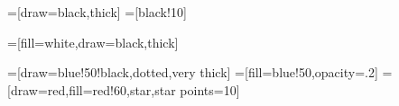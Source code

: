 =[draw=black,thick]
=[black!10]

=[fill=white,draw=black,thick]

=[draw=blue!50!black,dotted,very thick]
=[fill=blue!50,opacity=.2]
=[draw=red,fill=red!60,star,star points=10]